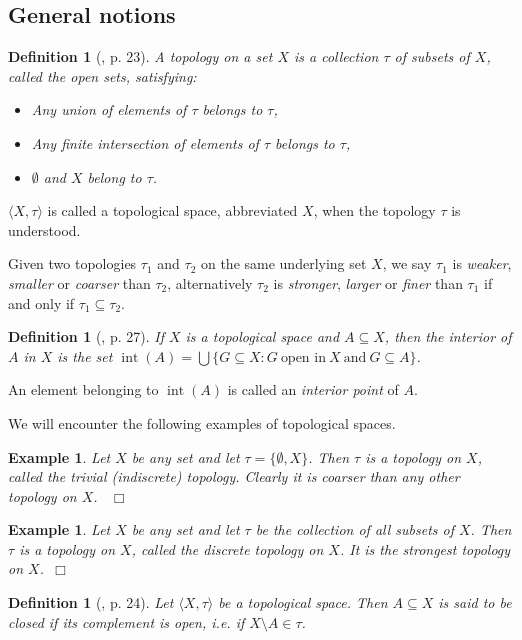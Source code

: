 \documentclass[12pt, oneside]{book}
\newtheorem{example}[theorem]{Example}
\newtheorem{definition}[theorem]{Definition}
\newcommand{\qed}{\hfill ~$\Box$\\}
\def\inter{\operatorname{int}}
\begin{document}
\subsection{General notions}
\begin{definition}[\cite{W2}, p. 23] \label{topology}
\normalfont 
\noindent A {\sl topology} on a set $X$ is a collection $\tau$ of subsets of $X$, called the 
{\sl open sets}, satisfying:
\begin{itemize}
\item [T1.] \quad Any union of elements of $\tau$ belongs to $\tau$,
\item [T2.] \quad Any finite intersection of elements of $\tau$ belongs to $\tau$,
\item [T3.] \quad $\emptyset$ and $X$ belong to $\tau$.
\end{itemize}
\end{definition}

\noindent $\langle X,\tau \rangle$ is called a topological space, abbreviated $X$, 
when the topology $\tau$ is understood.

\vskip 0.3cm

\noindent Given two topologies $\tau_1$ and $\tau_2$ on the same underlying set $X$, we say $\tau_1$ is {\sl weaker}, {\sl smaller} or {\sl coarser} than $\tau_2$, 
alternatively $\tau_2$ is {\sl stronger}, {\sl larger} or {\sl finer} than $\tau_1$ if and only if $\tau_1 \subseteq \tau_2$.
\begin{definition}[\cite{W2}, p. 27] 
\normalfont
If $X$ is a topological space and $A \subseteq X$, then the {\sl interior} of $A$ in $X$ is the set $\inter(A)=\bigcup \{ G \subseteq X: G\ \text{open in}\ X\ \text{and}\ G \subseteq A \}$.

\end{definition}

\noindent An element belonging to $\inter(A)$ is called an {\sl interior point} of $A$.

\vskip 0.3cm
\noindent We will encounter the following examples of topological spaces.

\begin{example} 
\normalfont
Let $X$ be any set and let $\tau = \{\emptyset, X \}$. Then $\tau$ is a topology on $X$, called the 
{\sl trivial (indiscrete)} topology. Clearly it is coarser than any other topology on $X$. \qed
\end{example}
\vspace{-1cm}
\begin{example} 
\normalfont
Let $X$ be any set and let $\tau$ be the collection of all subsets of $X$. Then $\tau$ is a topology on 
$X$, called the {\sl discrete} topology on $X$. It is the strongest topology on $X$.\qed
\end{example}
\vspace{-.5cm}
\begin{definition}[\cite{W2}, p. 24]
\normalfont
\noindent Let $\langle X, \tau \rangle$ be a topological space. Then $A \subseteq X$ is said to be 
{\sl closed} if its {\sl complement} is open, i.e. if $X \setminus A \in \tau$. 
\end{definition}
\end{document}
